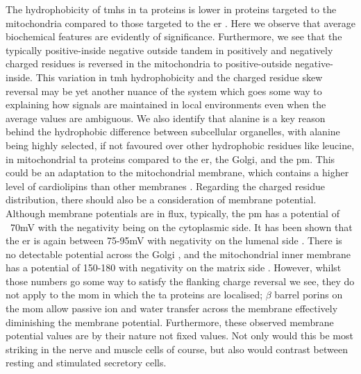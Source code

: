 The hydrophobicity of \gls{tmh}s in \gls{ta} proteins is lower in proteins targeted to the mitochondria compared to those targeted to the \gls{er} \cite{Borgese2007}.
Here we observe that average biochemical features are evidently of significance.
Furthermore, we see that the typically positive\--inside negative outside tandem in positively and negatively charged residues is reversed in the mitochondria to positive\--outside negative\--inside.
This variation in \gls{tmh} hydrophobicity and the charged residue skew reversal may be yet another nuance of the system which goes some way to explaining how signals are maintained in local environments even when the average values are ambiguous.
We also identify that alanine is a key reason behind the hydrophobic difference between subcellular organelles, with alanine being highly selected, if not favoured over other hydrophobic residues like leucine, in mitochondrial \gls{ta} proteins compared to the \gls{er}, the Golgi, and the \gls{pm}.
This could be an adaptation to the mitochondrial membrane, which contains a higher level of cardiolipins than other membranes \cite{VanMeer2008, Gebert2009}.
Regarding the charged residue distribution, there should also be a consideration of membrane potential.
Although membrane potentials are in flux, typically, the \gls{pm} has a potential of ~70mV with the negativity being on the cytoplasmic side.
It has been shown that the \gls{er} is again between 75-95mV with negativity on the lumenal side \cite{Qin2011, Worley1994}.
There is no detectable potential across the Golgi \cite{Schapiro2000}, and the mitochondrial inner membrane has a potential of 150-180 with negativity on the matrix side \cite{Perry2011}.
However, whilst those numbers go some way to satisfy the flanking charge reversal we see, they do not apply to the \gls{mom} in which the \gls{ta} proteins are localised; $\beta$ barrel porins on the \gls{mom} allow passive ion and water transfer across the membrane effectively diminishing the membrane potential.
Furthermore, these observed membrane potential values are by their nature not fixed values.
Not only would this be most striking in the nerve and muscle cells of course, but also would contrast between resting and stimulated secretory cells.

